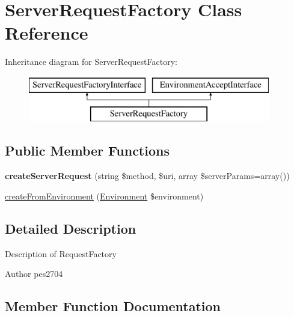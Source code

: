 \hypertarget{class_pes_1_1_http_1_1_factory_1_1_server_request_factory}{}\section{Server\+Request\+Factory Class Reference}
\label{class_pes_1_1_http_1_1_factory_1_1_server_request_factory}
Inheritance diagram for Server\+Request\+Factory\+:\begin{figure}[H]
\begin{center}
\leavevmode
\includegraphics[height=2.000000cm]{class_pes_1_1_http_1_1_factory_1_1_server_request_factory}
\end{center}
\end{figure}
\subsection*{Public Member Functions}
\begin{DoxyCompactItemize}
\item 
\mbox{\label{class_pes_1_1_http_1_1_factory_1_1_server_request_factory_a3b990039ec7c3da7c31dde637c5c8908}} 
{\bfseries create\+Server\+Request} (string \$method, \$uri, array \$server\+Params=array())
\item 
\mbox{\hyperlink{class_pes_1_1_http_1_1_factory_1_1_server_request_factory_aabcd9fd040e8ac574247abda286cb59f}{create\+From\+Environment}} (\mbox{\hyperlink{class_pes_1_1_http_1_1_environment}{Environment}} \$environment)
\end{DoxyCompactItemize}


\subsection{Detailed Description}
Description of Request\+Factory

\begin{DoxyAuthor}{Author}
pes2704 
\end{DoxyAuthor}


\subsection{Member Function Documentation}
\mbox{\label{class_pes_1_1_http_1_1_factory_1_1_server_request_factory_aabcd9fd040e8ac574247abda286cb59f}} 
